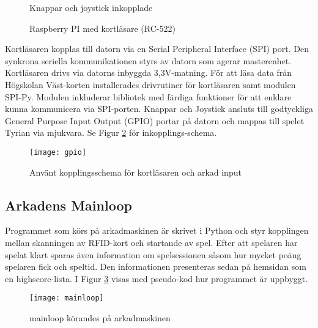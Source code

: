 \documentclass[12pt,fleqn,openany]{book} %
\begin{document}
\begin{figure}[!htb]
  \begin{minipage}{0.44\textwidth}
    \centering
    \caption{Knappar och joystick inkopplade}
    \label{fig_knappar}
  \end{minipage}\hfill
  \begin{minipage}{0.44\textwidth}
    \centering
    \caption{Raspberry PI med kortläsare (RC-522)}
    \label{fig_pirfid}
  \end{minipage}\hfill 
\end{figure}

Kortläsaren kopplas till datorn via en Serial Peripheral Interface (SPI) port. Den synkrona seriella kommunikationen styrs av 
datorn som agerar masterenhet. Kortläsaren drivs via datorns inbyggda 3,3V-matning. För att läsa data från Högskolan Väst-korten 
installerades drivrutiner för kortläsaren samt modulen SPI-Py. Modulen inkluderar bibliotek med färdiga funktioner för att enklare 
kunna kommunicera via SPI-porten. Knappar och Joystick ansluts till godtyckliga General Purpose Input Output (GPIO) portar på datorn 
och mappas till spelet Tyrian via mjukvara. Se Figur \ref{fig_gpio} för inkopplings-schema.

\begin{figure}[h]
\centering\texttt{[image: gpio]}
\caption{Använt kopplingsschema för kortläsaren och arkad input}
\label{fig_gpio}
\end{figure}

\subsection{Arkadens Mainloop}
Programmet som körs på arkadmaskinen är skrivet i Python och styr kopplingen mellan skanningen av RFID-kort och startande av spel. 
Efter att spelaren har spelat klart sparas även information om spelsessionen såsom hur mycket poäng spelaren fick och speltid. 
Den informationen presenteras sedan på hemsidan som en highscore-lista. I Figur \ref{fig_mainloop} visas med pseudo-kod hur programmet är uppbyggt. 

\begin{figure}[!h]
\texttt{[image: mainloop]}
\caption{mainloop körandes på arkadmaskinen}
\label{fig_mainloop}
\end{figure}
\end{document}
